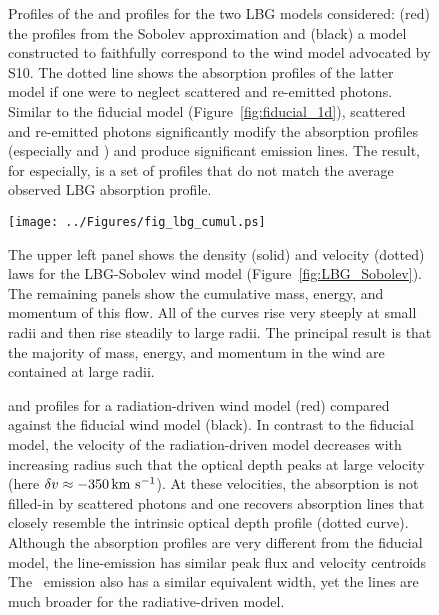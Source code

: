 \documentclass[12pt,preprint]{aastex}
\begin{document}
\clearpage

\begin{figure}
\caption{
Profiles of the  and  profiles for the two
LBG models considered: (red) the profiles from the 
Sobolev approximation 
and (black) a model constructed to faithfully
correspond to the wind model advocated by S10.  The dotted line
shows the absorption profiles of the latter model if one were
to neglect scattered and re-emitted photons.  Similar to the fiducial
model (Figure~\ref{fig:fiducial_1d}), scattered and re-emitted photons
significantly modify the absorption profiles (especially 
and \feiib)
and produce significant emission lines.  
The result, for  especially, is a set of profiles that do
not match the average observed LBG absorption profile.
}
\label{fig:LBG_spec}
\end{figure}

\begin{figure}
\texttt{[image: ../Figures/fig\_lbg\_cumul.ps]}
\caption{
The upper left panel shows the density (solid) and velocity (dotted)
laws for the LBG-Sobolev wind model (Figure~\ref{fig:LBG_Sobolev}).
The remaining panels show the cumulative mass, energy, and momentum of
this flow.  All of the curves rise very steeply at small radii and
then rise steadily to large radii.  The principal result is that the
majority of mass, energy, and momentum in the wind are contained at
large radii.
}
\label{fig:LBG_cumul}
\end{figure}



\begin{figure}
\caption{
 and 
profiles for a radiation-driven wind model (red) compared against the
fiducial wind model (black).  In contrast to the fiducial model, the
velocity of the radiation-driven model decreases with increasing
radius such that the optical depth peaks at large velocity (here $\delta v
\approx -350 \, {\rm km~s^{-1}}$).  At these velocities, the absorption is not
filled-in by scattered photons and one recovers absorption lines
that closely resemble the intrinsic optical depth profile (dotted
curve).  Although the  absorption profiles are very
different from the fiducial model, the  line-emission has
similar peak flux and velocity centroids 
The \feiis\ emission also has a similar
equivalent width, yet the lines are much broader for the
radiative-driven model. 
}
\label{fig:rad_spec}
\end{figure}
\end{document}
